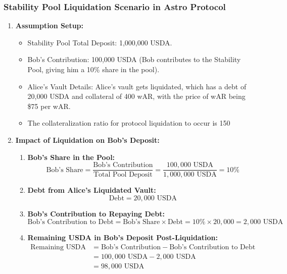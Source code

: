 \subsubsection{Stability Pool Liquidation Scenario in Astro Protocol}
\begin{enumerate}
    \item \textbf{Assumption Setup:}
    \begin{itemize}
        \item Stability Pool Total Deposit: 1,000,000 USDA.
        \item Bob's Contribution: 100,000 USDA (Bob contributes to the Stability Pool, giving him a 10\% share in the pool).
        \item Alice's Vault Details: Alice's vault gets liquidated, which has a debt of 20,000 USDA and collateral of 400 wAR, with the price of wAR being \$75 per wAR.
        \item The collateralization ratio for protocol liquidation to occur is 150%
    \end{itemize}

    \item \textbf{Impact of Liquidation on Bob's Deposit:}
    \begin{enumerate}
        \item \textbf{Bob's Share in the Pool:}
        $$
        \text{Bob's Share} = 
        \frac{\text{Bob's Contribution}}{\text{Total Pool Deposit}} =
        \frac{100,000 \text{ USDA}}{1,000,000 \text{ USDA}} = 10\%
        $$

        \item \textbf{Debt from Alice's Liquidated Vault:}
        $$
        \text{Debt} = 20,000 \text{ USDA}
        $$

        \item \textbf{Bob's Contribution to Repaying Debt:}
        $$
        \text{Bob's Contribution to Debt} = 
        \text{Bob's Share} \times \text{Debt} =
        10\% \times 20,000 = 2,000 \text{ USDA}
        $$

        \item \textbf{Remaining USDA in Bob's Deposit Post-Liquidation:}
        \begin{align*}
        \text{Remaining USDA} &= 
        \text{Bob's Contribution} - \text{Bob's Contribution to Debt} \\
        &= 100,000 \text{ USDA} - 2,000 \text{ USDA} \\
        &= 98,000 \text{ USDA}
        \end{align*}


\end{enumerate}
\end{enumerate}
